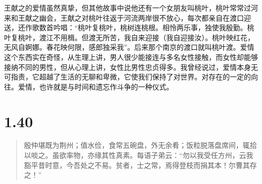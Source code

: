 \documentclass[]{book}
\begin{document}
王献之的爱情虽然真挚，但其他故事中说他还有一个女朋友叫桃叶，桃叶常常过河来和王献之幽会，王献之对桃叶往返于河流两岸很不放心，每次都亲自在渡口迎送，还作歌数首吟唱：``桃叶复桃叶，桃树连桃根。相怜两乐事，独使我殷勤。桃叶复桃叶，渡江不用楫。但渡无所苦，我自来迎接（我自迎接汝）。桃叶映红花，无风自婀娜。春花映何限，感郎独采我''。后来那个南京的渡口就叫桃叶渡。爱情这个东西实在奇怪，从生理上讲，男人很少能接连与多名女性接触，而女性却能够接纳不同的男性，但从心理上讲，女性比男性忠贞得多。我曾经说过，爱情本身无可指责，它超越了生活的无聊和卑微，它使我们保持了对世界。对存在的一定的向往。爱情，也许就是与时间和遗忘作斗争的一种仪式。

\section{1.40}\label{section-39}

\begin{quote}
殷仲堪既为荆州；值水俭，食常五碗盘，外无余肴；饭粒脱落盘席间，辄拾以啖之。虽欲率物，亦缘其性真素。每语子弟云：``勿以我受任方州，云我豁平昔时意，今吾处之不易。贫者，士之常，焉得登枝而捐其本！尔曹其存之！''
\end{quote}
\end{document}
